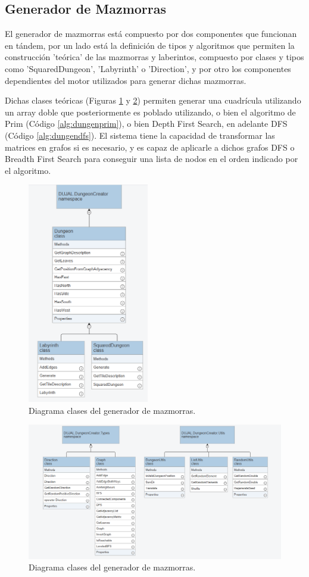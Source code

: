 \subsection{Generador de Mazmorras}
El generador de mazmorras está compuesto por dos componentes que funcionan en tándem, por un lado está la definición de tipos y algoritmos que permiten la construcción 
'teórica' de las mazmorras y laberintos, compuesto por clases y tipos como 'SquaredDungeon', 'Labyrinth' o 'Direction', y por otro los componentes dependientes del motor 
utilizados para generar dichas mazmorras.

Dichas clases teóricas (Figuras \ref{fig:dungen1} y \ref{fig:dungen2}) permiten generar una cuadrícula utilizando un array doble que posteriormente es poblado utilizando, o 
bien el algoritmo de Prim (Código \ref{alg:dungenprim}), o bien Depth First Search, en adelante DFS (Código \ref{alg:dungendfs}). El sistema tiene la capacidad de transformar 
las matrices en grafos si es necesario, y es capaz de aplicarle a dichos grafos DFS o Breadth First Search para conseguir una lista de nodos en el orden indicado
 por el algoritmo.  

\begin{figure}[H]
  \centering
    \includegraphics[width=200px,clip=true]{Dungeon_Generator.png}
  \caption{Diagrama clases del generador de mazmorras.}
  \label{fig:dungen1}
\end{figure}

\begin{figure}[H]
  \centering
    \includegraphics[width=450px,clip=true]{Dungeon_Generator_Utils.png}
  \caption{Diagrama clases del generador de mazmorras.}
  \label{fig:dungen2}
\end{figure}


